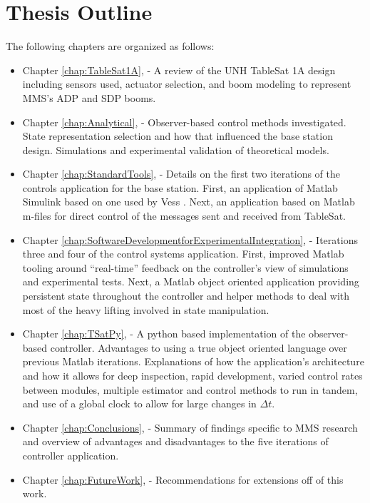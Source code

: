 \section{Thesis Outline}
\label{sec:ThesisOutline}

The following chapters are organized as follows:

\begin{itemize}
    \item Chapter \ref{chap:TableSat1A},  - A review of the UNH TableSat 1A design including sensors used, actuator selection, and boom modeling to represent MMS's ADP and SDP booms.
    \item Chapter \ref{chap:Analytical},  - Observer-based control methods investigated.  State representation selection and how that influenced the base station design.  Simulations and experimental validation of theoretical models.
    \item Chapter \ref{chap:StandardTools},  - Details on the first two iterations of the controls application for the base station.  First, an application of Matlab Simulink based on one used by Vess \cite{vessthesis}.  Next, an application based on Matlab m-files for direct control of the messages sent and received from TableSat.
    \item Chapter \ref{chap:SoftwareDevelopmentforExperimentalIntegration},  - Iterations three and four of the control systems application.  First, improved Matlab tooling around ``real-time'' feedback on the controller's view of simulations and experimental tests.  Next, a Matlab object oriented application providing persistent state throughout the controller and helper methods to deal with most of the heavy lifting involved in state manipulation.
    \item Chapter \ref{chap:TSatPy},  - A python based implementation of the observer-based controller.  Advantages to using a true object oriented language over previous Matlab iterations.  Explanations of how the application's architecture and how it allows for deep inspection, rapid development, varied control rates between modules, multiple estimator and control methods to run in tandem, and use of a global clock to allow for large changes in $\Delta t$.
    \item Chapter \ref{chap:Conclusions},  - Summary of findings specific to MMS research and overview of advantages and disadvantages to the five iterations of controller application.
    \item Chapter \ref{chap:FutureWork},  - Recommendations for extensions off of this work.
\end{itemize}

